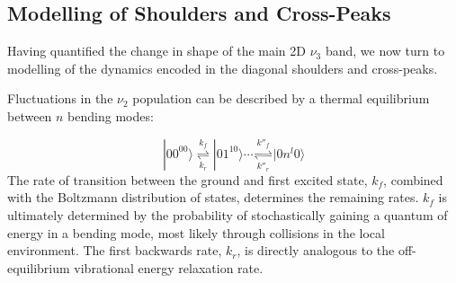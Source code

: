 \documentclass[%
  class = book,%
  crop = false,%
  float = true,%
  multi = true,%
  preview = false,%
]{standalone}
\begin{document}
{\subsection{Modelling of Shoulders and Cross-Peaks}
\label{sec:shoulders_modeling}

Having quantified the change in shape of the main 2D \(\nu_3\) band, we now turn to modelling of the dynamics encoded in the diagonal shoulders and cross-peaks.

Fluctuations in the  \(\nu_2\) population can be described by a thermal equilibrium between \(n\) bending modes:

\begin{equation}
  \label{eq:kinetic}
  |00^00 \rangle \overset{k_{f}}{\underset{k_{r}}\rightleftharpoons} |01^10 \rangle \cdots \overset{k''_{f}}{\underset{k''_{r}}\rightleftharpoons} |0n^l0 \rangle
\end{equation}
The rate of transition between the ground and first excited state, \(k_f\), combined with the Boltzmann distribution of states, determines the remaining rates. \(k_f\) is ultimately determined by the probability of stochastically gaining a quantum of energy in a  bending mode, most likely through collisions in the local environment. The first backwards rate, \(k_r\), is directly analogous to the off-equilibrium vibrational energy relaxation rate.

}
\end{document}
